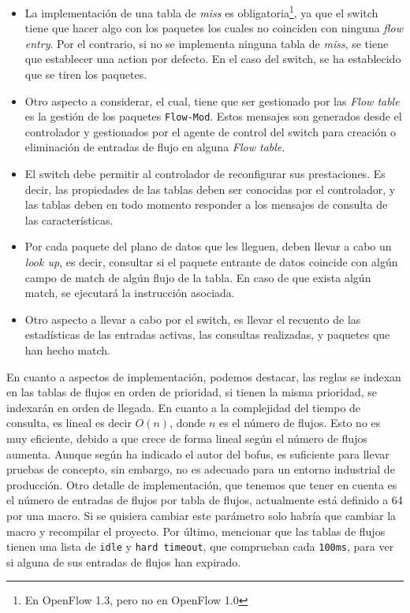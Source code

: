 \begin{itemize}
    \item La implementación de una tabla de \textit{miss} es obligatoria\footnote{En OpenFlow 1.3, pero no en OpenFlow 1.0}, ya que el switch tiene que hacer algo con los paquetes los cuales no coinciden con ninguna \textit{flow entry}. Por el contrario, si no se implementa ninguna tabla de \textit{miss}, se tiene que establecer una action por defecto. En el caso del switch, se ha establecido que se tiren los paquetes.

    \item Otro aspecto a considerar, el cual, tiene que ser gestionado por las \textit{Flow table} es la gestión de los paquetes \texttt{Flow-Mod}. Estos mensajes son generados desde el controlador y gestionados por el agente de control del switch para creación o eliminación de entradas de flujo en alguna \textit{Flow table}.

    \item El switch debe permitir al controlador de reconfigurar sus prestaciones. Es decir, las propiedades de las tablas deben ser conocidas por el controlador, y las tablas deben en todo momento responder a los mensajes de consulta de las características.

    \item Por cada paquete del plano de datos que les lleguen, deben llevar a cabo un \textit{look up},  es decir, consultar si el paquete entrante de datos coincide con algún campo de match de algún flujo de la tabla. En caso de que exista algún match, se ejecutará la instrucción asociada.

    \item  Otro aspecto a llevar a cabo por el switch, es llevar el recuento de las estadísticas de las entradas activas, las consultas realizadas, y paquetes que han hecho match.
\end{itemize}


En cuanto a aspectos de implementación, podemos destacar, las reglas se indexan en las tablas de flujos en orden de prioridad, si tienen la misma prioridad, se indexarán en orden de llegada. En cuanto a la complejidad del tiempo de consulta, es lineal es decir $O(n)$, donde $n$ es el número de flujos. Esto no es muy eficiente, debido a que crece de forma lineal según el número de flujos aumenta. Aunque según ha indicado el autor del \gls{bofus}, es suficiente para llevar pruebas de concepto, sin embargo, no es adecuado para un entorno industrial de producción. Otro detalle de implementación, que tenemos que tener en cuenta es el número de entradas de flujos por tabla de flujos, actualmente está definido a 64 por una macro.  Si se quisiera cambiar este parámetro solo habría que cambiar la macro y recompilar el proyecto. Por último, mencionar que las tablas de flujos tienen una lista de \texttt{idle} y \texttt{hard timeout}, que comprueban cada \texttt{100ms}, para ver si alguna de sus entradas de flujos han expirado.

